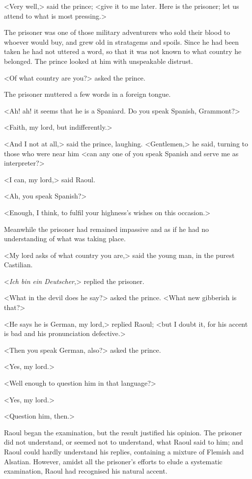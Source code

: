 <Very well,> said the prince; <give it to me later. Here is the prisoner; let us attend to what is most pressing.>

The prisoner was one of those military adventurers who sold their blood to whoever would buy, and grew old in stratagems and spoils. Since he had been taken he had not uttered a word, so that it was not known to what country he belonged. The prince looked at him with unspeakable distrust.

<Of what country are you?> asked the prince.

The prisoner muttered a few words in a foreign tongue.

<Ah! ah! it seems that he is a Spaniard. Do you speak Spanish, Grammont?>

<Faith, my lord, but indifferently.>

<And I not at all,> said the prince, laughing. <Gentlemen,> he said, turning to those who were near him <can any one of you speak Spanish and serve me as interpreter?>

<I can, my lord,> said Raoul.

<Ah, you speak Spanish?>

<Enough, I think, to fulfil your highness's wishes on this occasion.>

Meanwhile the prisoner had remained impassive and as if he had no understanding of what was taking place.

<My lord asks of what country you are,> said the young man, in the purest Castilian.

<\textit{Ich bin ein Deutscher},> replied the prisoner.

<What in the devil does he say?> asked the prince. <What new gibberish is that?>

<He says he is German, my lord,> replied Raoul; <but I doubt it, for his accent is bad and his pronunciation defective.>

<Then you speak German, also?> asked the prince.

<Yes, my lord.>

<Well enough to question him in that language?>

<Yes, my lord.>

<Question him, then.>

Raoul began the examination, but the result justified his opinion. The prisoner did not understand, or seemed not to understand, what Raoul said to him; and Raoul could hardly understand his replies, containing a mixture of Flemish and Alsatian. However, amidst all the prisoner's efforts to elude a systematic examination, Raoul had recognised his natural accent.

